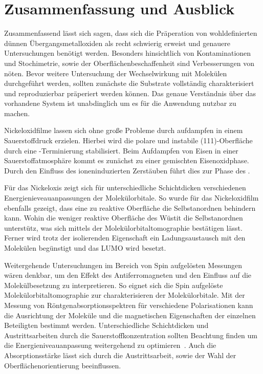 \chapter{Zusammenfassung und Ausblick}
    Zusammenfassend lässt sich sagen, dass sich die Präperation von wohldefinierten dünnen Übergangsmetalloxiden als recht schwierig erweist und genauere Untersuchungen benötigt werden.
    Besonders hinsichtlich von Kontaminationen und Stochimetrie, sowie der Oberflächenbeschaffenheit sind Verbesserungen von nöten.
    Bevor weitere Untersuchung der Wechselwirkung mit Molekülen durchgeführt werden, sollten zunächste die Substrate vollständig charakterisiert und reproduzierbar präperiert werden können.
    Das genaue Verständnis über das vorhandene System ist unabdinglich um es für die Anwendung nutzbar zu machen.

    Nickeloxidfilme lassen sich ohne große Probleme durch aufdampfen in einem Sauerstoffdruck erzielen.
    Hierbei wird die polare und instabile (111)-Oberfläche durch eine -Terminierung stabilisiert.
    Beim Aufdampfen von Eisen in einer Sauerstoffatmosphäre kommt es zunächst zu einer gemischten Eisenoxidphase.
    Durch den Einfluss des ioneninduzierten Zerstäuben führt dies zur Phase des .
    
    Für das Nickeloxis zeigt sich für unterschiedliche Schichtdicken verschiedenen Energienieveauanpassungen der Molekülorbitale.
    So wurde für das Nickeloxidfilm ebenfalls gezeigt, dass eine zu reaktive Oberfläche die Selbstanordnen behindern kann.
    Wohin die weniger reaktive Oberfläche des Wüstit die Selbstanordnen unterstütz, was sich mittels der Molekülorbitaltomographie bestätigen lässt.
    Ferner wird trotz der isolierenden Eigenschaft ein Ladungsaustausch mit den Molekülen begünstigt und das LUMO wird besetzt.

    Weitergehende Untersuchungen im Bereich von Spin aufgelösten Messungen wären denkbar, um den Effekt des Antiferromagneten und den Einfluss auf die Molekülbesetzung zu interpretieren.
    So eignet sich die Spin aufgelöste Molekülorbitaltomographie zur charakterisieren der Molekülorbitale.
    Mit der Messung von Röntgenabsorptionsspektren für verschiedene Polarisationen kann die Ausrichtung der Moleküle und die magnetischen Eigenschaften der einzelnen Beteiligten bestimmt werden.
    Unterschiedliche Schichtdicken und Austrittsarbeiten durch die Sauerstoffkonzentration sollten Beachtung finden um die Energieniveauanpassung weitergehend zu optimieren~\cite{IF_8}.
    Auch die Absorptionsstärke lässt sich durch die Austrittsarbeit, sowie der Wahl der Oberflächenorientierung beeinflussen.
